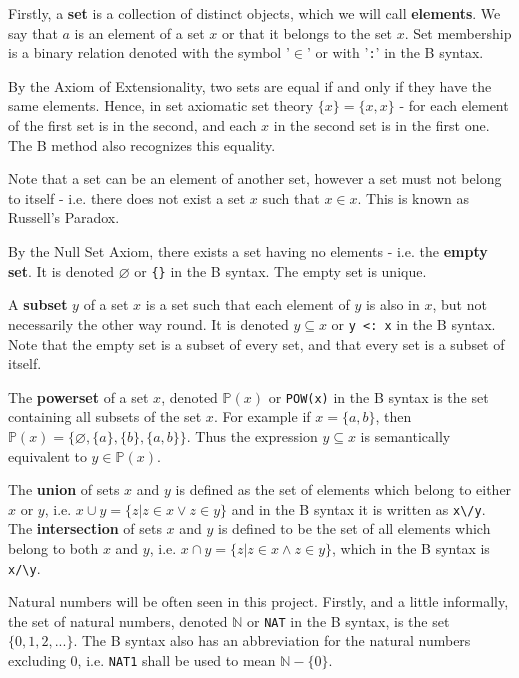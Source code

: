 \documentclass[11pt,journal]{IEEEtran}
\begin{document}
	Firstly, a \textbf{set} is a collection of distinct objects, which we will call \textbf{elements}. We say that $a$ is an element of a set $x$ or that it belongs to the set $x$. Set membership is a binary relation denoted with the symbol '$\in$' or with '\texttt{:}' in the B syntax.
	
	By the Axiom of Extensionality, two sets are equal if and only if they have the same elements. Hence, in set axiomatic set theory $\{x\} = \{x, x\}$ - for each element of the first set is in the second, and each $x$ in the second set is in the first one. The B method also recognizes this equality\cite{b-method}. 
	
	Note that a set can be an element of another set, however a set must not belong to itself - i.e. there does not exist a set $x$ such that $x \in x$. This is known as Russell's Paradox.
	
	By the Null Set Axiom, there exists a set having no elements - i.e. the \textbf{empty set}. It is denoted $\varnothing$ or \texttt{\{\}} in the B syntax. The empty set is unique.
	
	A \textbf{subset} $y$ of a set $x$ is a set such that each element of $y$ is also in $x$, but not necessarily the other way round. It is denoted $y \subseteq x$ or \texttt{y <: x} in the B syntax. Note that the empty set is a subset of every set, and that every set is a subset of itself.
	
	The \textbf{powerset} of a set $x$, denoted $\mathbb{P}(x)$ or \texttt{POW(x)} in the B syntax is the set containing all subsets of the set $x$. For example if $x = \{a,b\}$, then $\mathbb{P}(x) = \{\varnothing, \{a\}, \{b\}, \{a,b\}\}$. Thus the expression $y \subseteq x$ is semantically equivalent to $y \in \mathbb{P}(x)$. 
	
	The \textbf{union} of sets $x$ and $y$ is defined as the set of elements which belong to either $x$ or $y$, i.e. $x \cup y = \{z| z \in x \vee z \in y\}$ and in the B syntax it is written as \verb|x\/y|. The \textbf{intersection} of sets $x$ and $y$ is defined to be the set of all elements which belong to both $x$ and $y$, i.e. $x \cap y = \{z | z \in x \wedge z \in y \}$, which in the B syntax is \verb|x/\y|.

	
	Natural numbers will be often seen in this project. Firstly, and a little informally, the set of natural numbers, denoted $\mathbb{N}$ or \texttt{NAT} in the B syntax, is the set $\{0,1,2, ...\}$. The B syntax also has an abbreviation for the natural numbers excluding 0, i.e. \texttt{NAT1} shall be used to mean $\mathbb{N}-\{0\}$.
	
\end{document}
